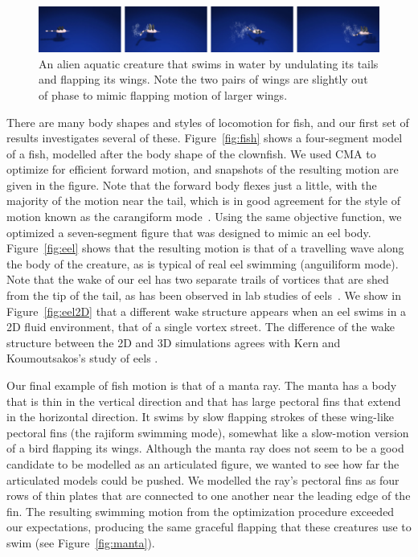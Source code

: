 \begin{figure}[ht]
\centering
\includegraphics[width=\textwidth]{figures/alien.eps}
\caption{An alien aquatic creature that swims in water by undulating its tails and flapping its wings. Note the two pairs of wings are slightly out of phase to mimic flapping motion of larger wings.}
\label{fig:alien}
\end{figure}



There are many body shapes and styles of locomotion for fish, and our
first set of results investigates several of these.  Figure~\ref{fig:fish}
shows a four-segment model of a fish, modelled after the body shape of the
clownfish.  We used CMA to optimize for efficient forward motion, and snapshots of the resulting motion are given in the figure.  Note that the
forward body flexes just a little, with the majority of the motion near
the tail, which is in good agreement for the style of motion known as the
carangiform mode~\cite{lindsey1978form}.  Using the same objective
function, we optimized a seven-segment figure that was designed to mimic
an eel body.  Figure~\ref{fig:eel} shows that the resulting motion is that
of a travelling wave along the body of the creature, as is typical of real
eel swimming (anguiliform mode).  Note that the wake of our eel has two
separate trails of vortices that are shed from the tip of the tail, as has
been observed in lab studies of eels~\cite{tytell2004hydrodynamics}. We show in Figure~\ref{fig:eel2D} that a different wake structure appears when an eel swims in a 2D fluid environment, that of a single vortex street. The difference of the wake structure between the 2D and 3D simulations agrees with Kern and Koumoutsakos's study of eels \cite{kern2006simulations}.


Our final example of fish motion is that of a manta ray.  The manta has a
body that is thin in the vertical direction and that has large pectoral fins
that extend in the horizontal direction.  It swims by slow flapping strokes
of these wing-like pectoral fins (the rajiform swimming mode), somewhat like
a slow-motion version of a bird flapping its wings.  Although the manta ray
does not seem to be a good candidate to be modelled as an articulated
figure, we wanted to see how far the articulated models could be pushed.  We
modelled the ray's pectoral fins as four rows of thin plates that are
connected to one another near the leading edge of the fin.  The resulting
swimming motion from the optimization procedure exceeded our expectations,
producing the same graceful flapping that these creatures use to swim (see
Figure~\ref{fig:manta}).

